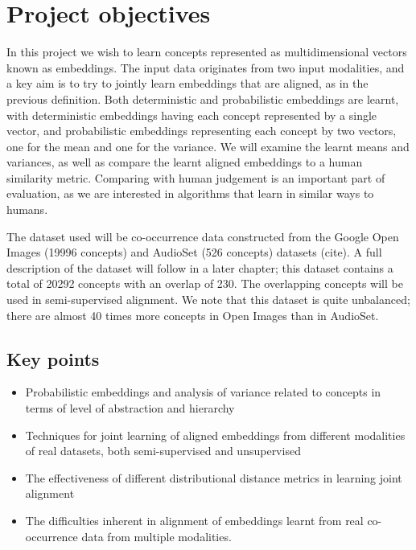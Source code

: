 \section{Project objectives}
In this project we wish to learn concepts represented as multidimensional vectors known as embeddings. The input data originates from two input modalities, and a key aim is to try to jointly learn embeddings that are aligned, as in the previous definition. Both deterministic and probabilistic embeddings are learnt, with deterministic embeddings having each concept represented by a single vector, and probabilistic embeddings representing each concept by two vectors, one for the mean and one for the variance. We will examine the learnt means and variances, as well as compare the learnt aligned embeddings to a human similarity metric. Comparing with human judgement is an important part of evaluation, as we are interested in algorithms that learn in similar ways to humans. 

The dataset used will be co-occurrence data constructed from the Google Open Images (19996 concepts) and AudioSet (526 concepts) datasets (cite). A full description of the dataset will follow in a later chapter; this dataset contains a total of 20292 concepts with an overlap of 230. The overlapping concepts will be used in semi-supervised alignment. We note that this dataset is quite unbalanced; there are almost 40 times more concepts in Open Images than in AudioSet. 

\subsection{Key points}
\begin{itemize}
    \item Probabilistic embeddings and analysis of variance related to concepts in terms of level of abstraction and hierarchy
    \item Techniques for joint learning of aligned embeddings from different modalities of real datasets, both semi-supervised and unsupervised
    \item The effectiveness of different distributional distance metrics in learning joint alignment 
    \item The difficulties inherent in alignment of embeddings learnt from real co-occurrence data from multiple modalities. 
\end{itemize}
